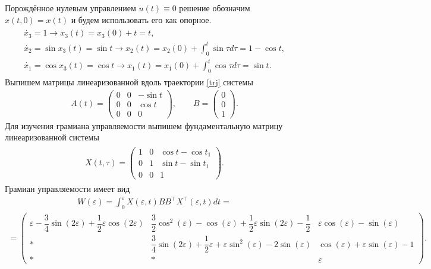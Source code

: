 \documentclass[../main.tex]{subfiles}
\begin{document}
    Порождённое нулевым управлением $ u(t) \equiv 0 $ решение обозначим $ x(t,0) = x(t) $ и будем использовать его как опорное. 
    \begin{gather}\label{trj}
        \begin{gathered}
            \dot{x_3} = 1 \longrightarrow x_3(t) = x_3(0) + t = t, \\
            \dot{x_2} = \sin x_3(t)  = \sin t \longrightarrow x_2(t) = x_2(0) + \int_0^t \sin \tau d\tau = 1 - \cos t,\\
            \dot{x_1} = \cos x_3(t) = \cos t  \longrightarrow x_1(t) = x_1(0) + \int_0^t \cos \tau d\tau = \sin t.
        \end{gathered}
    \end{gather}
    Выпишем матрицы линеаризованной вдоль траектории \eqref{trj} системы 
    \begin{gather*}
        A(t) = \begin{pmatrix}
            0 & 0 & -\sin t \\ 
            0 & 0 & \cos t \\ 
            0 & 0 & 0
        \end{pmatrix}, \qquad  B = \begin{pmatrix}
            0 \\ 
            0 \\ 
            1
        \end{pmatrix}.
    \end{gather*}
    Для изучения грамиана управляемости выпишем фундаментальную матрицу линеаризованной системы
    \begin{gather*}
        \begin{gathered}
            X(t,\tau) = \begin{pmatrix}
                1 & 0 & \cos t-\cos t_1 \\ 
                0 & 1 & \sin t-\sin t_1 \\ 
                0 & 0 & 1
            \end{pmatrix}.
        \end{gathered}    
    \end{gather*}
    Грамиан управляемости имеет вид
    \begin{gather*}
        W(\varepsilon) = \int_0^{\varepsilon}X(\varepsilon,t) B B^{\top} X^{\top}(\varepsilon,t)dt =
    \end{gather*}
    \begin{gather*}
        =\begin{pmatrix}
            \varepsilon-\dfrac{3}{4} \sin(2\varepsilon) +\dfrac{1}{2}\varepsilon \cos(2\varepsilon)& \dfrac{3}{2}\cos^2(\varepsilon) - \cos(\varepsilon) + \dfrac{1}{2}\varepsilon \sin(2 \varepsilon) - \dfrac{1}{2} &  \varepsilon\cos( \varepsilon)-\sin( \varepsilon) \\[8pt] 
            * & \dfrac{3}{4}\sin(2\varepsilon) + \dfrac{1}{2}\varepsilon + \varepsilon \sin^2(\varepsilon) - 2 \sin(\varepsilon) & \cos(\varepsilon) + \varepsilon\sin(\varepsilon)-1 \\ 
            * & * & \varepsilon
        \end{pmatrix}.    
    \end{gather*}
\end{document}
